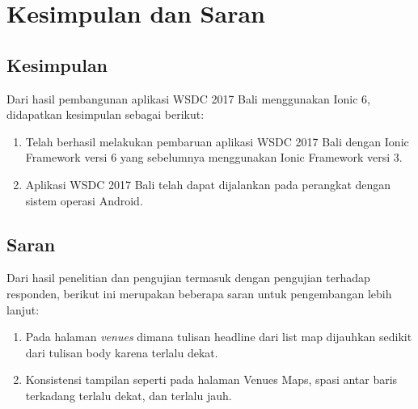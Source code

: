 \chapter{Kesimpulan dan Saran}
\label{chap:kesimpulanSaran}

\section{Kesimpulan} 
\label{sec:kesimpulan}

Dari hasil pembangunan aplikasi WSDC 2017 Bali menggunakan Ionic 6, didapatkan kesimpulan sebagai berikut:

\begin{enumerate}
	\item Telah berhasil melakukan pembaruan aplikasi WSDC 2017 Bali dengan Ionic Framework versi 6 yang sebelumnya menggunakan Ionic Framework versi 3.
	\item Aplikasi WSDC 2017 Bali telah dapat dijalankan pada perangkat dengan sistem operasi Android.
\end{enumerate}

\section{Saran} 
\label{sec:saran}

Dari hasil penelitian dan pengujian termasuk dengan pengujian terhadap responden, berikut ini merupakan beberapa saran untuk pengembangan lebih lanjut:

\begin{enumerate}
	\item Pada halaman \textit{venues} dimana tulisan headline dari list map dijauhkan sedikit dari tulisan body karena terlalu dekat.
	\item Konsistensi tampilan seperti pada halaman Venues Maps, spasi antar baris terkadang terlalu dekat, dan terlalu jauh.
\end{enumerate}